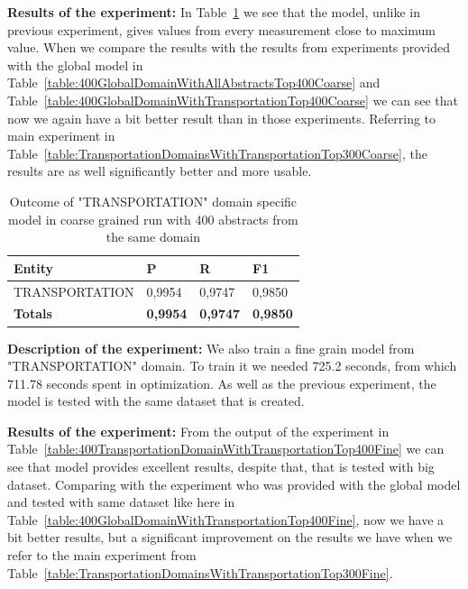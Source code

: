 \documentclass[thesis=M,english]{FITthesis}[2018/05/30]
\begin{document}
\textbf{Results of the experiment:} In Table~\ref{table:400TransportationDomainWithTransportationTop400Coarse} we see that the model, unlike in previous experiment, gives values from every measurement close to maximum value. When we compare the results with the results from experiments provided with the global model in Table~\ref{table:400GlobalDomainWithAllAbstractsTop400Coarse} and Table~\ref{table:400GlobalDomainWithTransportationTop400Coarse} we can see that now we again have a bit better result than in those experiments. Referring to main experiment in Table~\ref{table:TransportationDomainsWithTransportationTop300Coarse}, the results are as well significantly better and more usable.

	\begin{table}[H]\centering
		\begin{tabular}{|l|l|l|l|}
			\hline {\textbf{Entity}} & {\textbf{P}} & {\textbf{R}} & {\textbf{F1}}\\\hline
				TRANSPORTATION & 0,9954 & 0,9747 & 0,9850\\\hline
				\textbf{Totals} & \textbf{0,9954} & \textbf{0,9747} & \textbf{0,9850}\\\hline
		\end{tabular}
		\caption{Outcome of "TRANSPORTATION" domain specific model in coarse grained run with 400 abstracts from the same domain \label{table:400TransportationDomainWithTransportationTop400Coarse}}
	\end{table}
	
\textbf{Description of the experiment:} We also train a fine grain model from "TRANSPORTATION" domain. To train it we needed 725.2 seconds, from which 711.78 seconds spent in optimization. As well as the previous experiment, the model is tested with the same dataset that is created.

\textbf{Results of the experiment:}	From the output of the experiment in Table~\ref{table:400TransportationDomainWithTransportationTop400Fine} we can see that model provides excellent results, despite that, that is tested with big dataset. Comparing with the experiment who was provided with the global model and tested with same dataset like here in Table~\ref{table:400GlobalDomainWithTransportationTop400Fine}, now we have a bit better results, but a significant improvement on the results we have when we refer to the main experiment from Table~\ref{table:TransportationDomainsWithTransportationTop300Fine}.	
	
\end{document}
